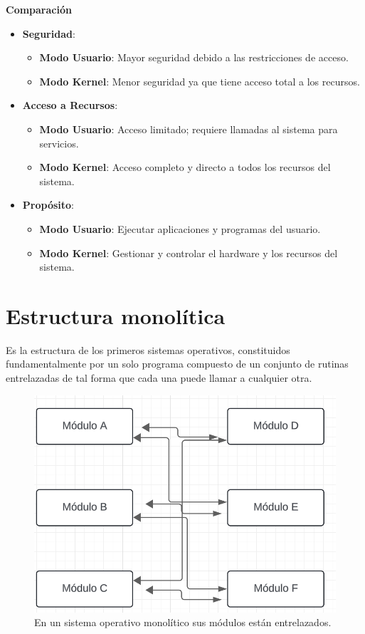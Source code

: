 \textbf{Comparación}

\begin{itemize}
	\item \textbf{Seguridad}:
	\begin{itemize}
		\item \textbf{Modo Usuario}: Mayor seguridad debido a las restricciones de acceso.
		\item \textbf{Modo Kernel}: Menor seguridad ya que tiene acceso total a los recursos.
	\end{itemize}
	\item \textbf{Acceso a Recursos}:
	\begin{itemize}
		\item \textbf{Modo Usuario}: Acceso limitado; requiere llamadas al sistema para servicios.
		\item \textbf{Modo Kernel}: Acceso completo y directo a todos los recursos del sistema.
	\end{itemize}
	\item \textbf{Propósito}:
	\begin{itemize}
		\item \textbf{Modo Usuario}: Ejecutar aplicaciones y programas del usuario.
		\item \textbf{Modo Kernel}: Gestionar y controlar el hardware y los recursos del sistema.
	\end{itemize}
\end{itemize}


 

\section{Estructura monolítica}

Es la estructura de los primeros sistemas operativos, constituidos fundamentalmente por un solo programa compuesto de un conjunto de rutinas entrelazadas de tal forma que cada una puede llamar a cualquier otra.

\begin{figure}[H]
	\centering
	\includegraphics[width=0.6\linewidth]{Imagenes/monolitico.png}
	\caption{En un sistema operativo monolítico sus módulos están entrelazados. }
	\label{fig:enter-label}
\end{figure}

